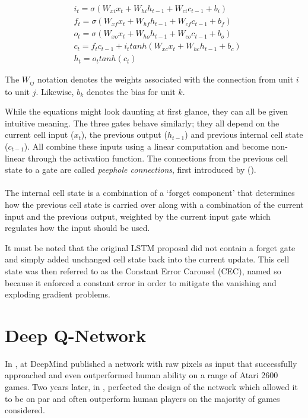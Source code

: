 \begin{align}
  &i_t = \sigma(W_{xi}x_t + W_{hi}h_{t-1}+W_{ci}c_{t-1} + b_i) \\
  &f_t = \sigma(W_{xf}x_t + W_{hf}h_{t-1}+W_{cf}c_{t-1} + b_f) \\
  &o_t = \sigma(W_{xo}x_t + W_{ho}h_{t-1}+W_{co}c_{t-1} + b_o) \\
  &c_t = f_tc_{t-1}+i_t tanh(W_{xc}x_t+W_{hc}h_{t-1}+b_c) \\
  &h_t = o_t tanh(c_t)
\end{align}

The $W_{ij}$ notation denotes the weights associated
with the connection from unit $i$ to unit $j$.
Likewise, $b_k$ denotes the bias for unit $k$.

While the equations might look daunting at first glance,
they can all be given intuitive meaning.
The three gates behave similarly;
they all depend on the current cell input ($x_t$),
the previous output ($h_{t-1}$)
and previous internal cell state ($c_{t-1}$).
All combine these inputs using a linear computation
and become non-linear through the activation function.
The connections from the previous cell state
to a gate are called \textit{peephole connections},
first introduced by
\citeauthor{gers2000recurrent} (\citeyear{gers2000recurrent}).

\paragraph{}
The internal cell state is a combination
of a `forget component' that determines
how the previous cell state is carried over
along with a combination of the current input and the previous output,
weighted by the current input gate
which regulates how the input should be used.

It must be noted that the original LSTM proposal
did not contain a forget gate
and simply added unchanged cell state
back into the current update.
This cell state was then referred to as the Constant Error Carousel (CEC),
named so because it enforced a constant error
in order to mitigate the vanishing and exploding gradient problems.


\section{Deep Q-Network}
\label{sec:deep_q_network}
In \citeyear{Mnih2013},
\citeauthor{Mnih2013} at DeepMind
published a network
with raw pixels as input
that successfully
approached and even outperformed human ability
on a range of Atari 2600 games.
Two years later,
in \citeyear{Mnih2015},
\citeauthor{Mnih2015}
perfected the design of the network
which allowed it to be on par
and often outperform human players
on the majority of games considered.

